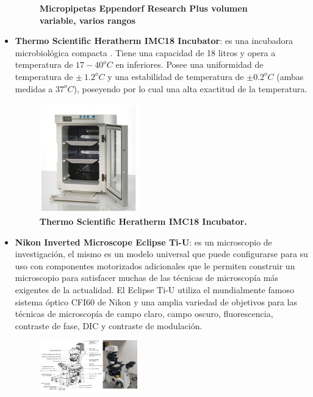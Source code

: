 \begin{itemize}
\begin{figure}
            \caption{\textbf{Micropipetas Eppendorf Research Plus volumen variable, varios rangos}}
            \label{pipeta}
        \end{figure}
     \item \textbf{\textcolor{morado}{Thermo Scientific Heratherm IMC18 Incubator}}: es una incubadora microbiológica compacta . Tiene una capacidad de 18 litros y opera a temperatura de $17-40^oC$ en inferiores. Posee una uniformidad de temperatura de $\pm~ 1.2^oC$  y una estabilidad de temperatura de $\pm 0.2^oC$ (ambas medidas a $37^oC$), poseyendo por lo cual una alta exactitud de la temperatura.
        \begin{figure}
            \includegraphics[width=0.4\textwidth]{Tarea1/incubadora.png}
        \caption{\textbf{Thermo Scientific Heratherm IMC18 Incubator.}}
        \label{incubadora}
        \end{figure}
        \item  \textbf{\textcolor{morado}{Nikon Inverted Microscope Eclipse Ti-U}}: es  un microscopio de investigación, el mismo es un modelo universal que puede configurarse para su uso con componentes motorizados adicionales que le permiten construir un microscopio para satisfacer muchas de las técnicas de microscopía más exigentes de la actualidad. El Eclipse Ti-U utiliza el mundialmente famoso sistema óptico CFI60 de Nikon y una amplia variedad de objetivos para las técnicas de microscopía de campo claro, campo oscuro, fluorescencia, contraste de fase, DIC y contraste de modulación.%
        \begin{figure}
            \includegraphics[width=0.4\textwidth]{Tarea1/microscopio.png}

\end{figure}
\end{itemize}
